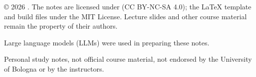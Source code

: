 \thispagestyle{empty}
\vspace*{\fill}

\begingroup
\small
\setlength{\parskip}{0.8em}

\doclicenseImage[imagewidth=6em]

© 2026 \notesauthor. The notes are licensed under \doclicenseLongNameRef{} (CC BY-NC-SA 4.0); the \LaTeX{} template and build files under the MIT License. Lecture slides and other course material remain the property of their authors.

\notesurl[]

Large language models (LLMs) were used in preparing these notes.

Personal study notes, not official course material, not endorsed by the University of Bologna or by the instructors.
\endgroup

\clearpage

